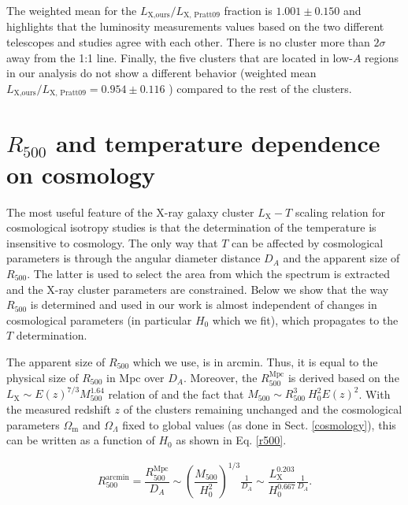 \documentclass{aa}   %
\begin{document}
The weighted mean for the $L_{\text{X,ours}}/L_{\text{X, Pratt09}}$ fraction is $1.001\pm0.150$ and highlights that the luminosity measurements values based on the two different telescopes and studies agree with each other. There is no cluster more than $2\sigma$ away from the 1:1 line. Finally, the five clusters that are located in low-$A$ regions in our analysis do not show a different behavior (weighted mean $L_{\text{X,ours}}/L_{\text{X, Pratt09}}=0.954\pm 0.116$ ) compared to the rest of the clusters.

\section{$R_{500}$ and temperature dependence on cosmology}

The most useful feature of the X-ray galaxy cluster $L_{\text{X}}-T$ scaling relation for cosmological isotropy studies is that the determination of the temperature is insensitive to cosmology. The only way that $T$ can be affected by cosmological parameters is through the angular diameter distance $D_A$ and the apparent size of $R_{500}$. The latter is used to select the area from which the spectrum is extracted and the X-ray cluster parameters are constrained. Below we show that the way $R_{500}$ is determined and used in our work is almost independent of changes in cosmological parameters (in particular $H_0$ which we fit), which propagates to the $T$ determination.

The apparent size of $R_{500}$ which we use, is in arcmin. Thus, it is equal to the physical size of $R_{500}$ in Mpc over $D_A$. Moreover, the $R_{500}^{\text{Mpc}}$ is derived based on the $L_{\text{X}}\sim E(z)^{7/3}M_{500}^{1.64}$ relation of \citet{arnaud2} and the fact that $M_{500}\sim R_{500}^3 \ H_0^2E(z)^2$.
With the measured redshift $z$ of the clusters remaining unchanged and the cosmological parameters $\Omega_{\text{m}}$ and $\Omega_{\Lambda}$ fixed to global values (as done in Sect. \ref{cosmology}), this can be written as a function of $H_0$ as shown in Eq. \ref{r500}.

\begin{equation}
\begin{aligned}
R_{500}^{\text{arcmin}}=\dfrac{R_{500}^{\text{Mpc}}}{D_A}\sim \left(\dfrac{M_{500}}{H_0^2}\right)^{1/3}\frac{1}{D_A}\sim \dfrac{L_{\text{X}}^{0.203}}{H_0^{0.667}}\frac{1}{D_A}.
\label{r500}
\end{aligned}
\end{equation}
\end{document}
